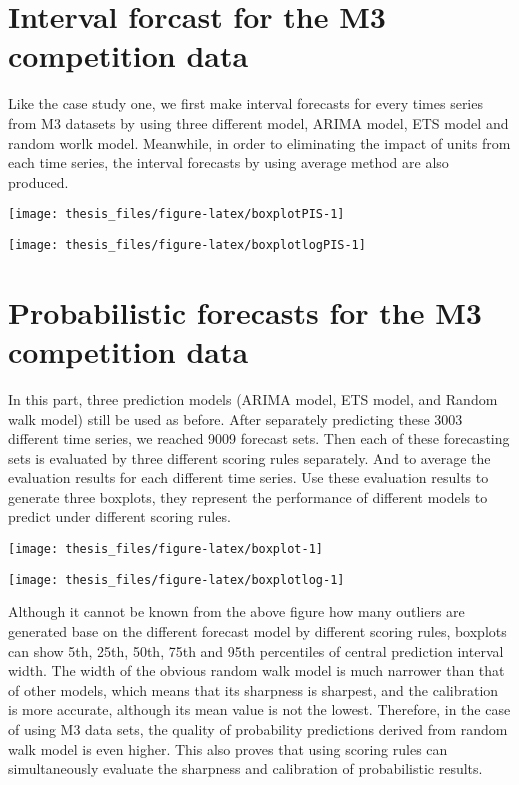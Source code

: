 \documentclass{monashthesis}
\theoremstyle{definition}
\theoremstyle{definition}
\theoremstyle{definition}
\theoremstyle{remark}
\begin{document}
\section{Interval forcast for the M3 competition
data}\label{interval-forcast-for-the-m3-competition-data}

Like the case study one, we first make interval forecasts for every
times series from M3 datasets by using three different model, ARIMA
model, ETS model and random worlk model. Meanwhile, in order to
eliminating the impact of units from each time series, the interval
forecasts by using average method are also produced.

\texttt{[image: thesis\_files/figure-latex/boxplotPIS-1]}

\texttt{[image: thesis\_files/figure-latex/boxplotlogPIS-1]}

\section{Probabilistic forecasts for the M3 competition
data}\label{probabilistic-forecasts-for-the-m3-competition-data}

In this part, three prediction models (ARIMA model, ETS model, and
Random walk model) still be used as before. After separately predicting
these 3003 different time series, we reached 9009 forecast sets. Then
each of these forecasting sets is evaluated by three different scoring
rules separately. And to average the evaluation results for each
different time series. Use these evaluation results to generate three
boxplots, they represent the performance of different models to predict
under different scoring rules.

\texttt{[image: thesis\_files/figure-latex/boxplot-1]}

\texttt{[image: thesis\_files/figure-latex/boxplotlog-1]}

Although it cannot be known from the above figure how many outliers are
generated base on the different forecast model by different scoring
rules, boxplots can show 5th, 25th, 50th, 75th and 95th percentiles of
central prediction interval width. The width of the obvious random walk
model is much narrower than that of other models, which means that its
sharpness is sharpest, and the calibration is more accurate, although
its mean value is not the lowest. Therefore, in the case of using M3
data sets, the quality of probability predictions derived from random
walk model is even higher. This also proves that using scoring rules can
simultaneously evaluate the sharpness and calibration of probabilistic
results.
\end{document}
